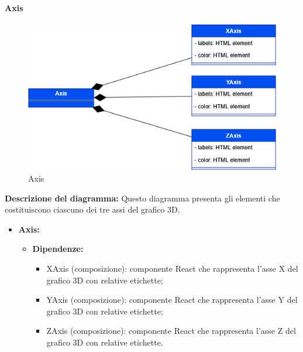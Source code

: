 \paragraph{Axis}
\begin{figure}[h!] \centering
    \includegraphics[scale=0.45]{template/images/uml_front/ui/axis.png}
    \caption{Axis}
\end{figure}
\textbf{Descrizione del diagramma:}
Questo diagramma presenta gli elementi che costituiscono ciascuno dei tre assi del grafico 3D.
\begin{itemize}
    \item \textbf{Axis:}
    \begin{itemize}
        \item \textbf{Dipendenze:}
        \begin{itemize}
            \item XAxis (composizione): componente React che rappresenta l'asse X del grafico 3D con relative etichette;
            \item YAxis (composizione): componente React che rappresenta l'asse Y del grafico 3D con relative etichette;
            \item ZAxis (composizione): componente React che rappresenta l'asse Z del grafico 3D con relative etichette.
        \end{itemize} 
    \end{itemize}
\end{itemize}